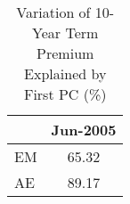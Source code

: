 \begin{footnotesize}\begin{table}\centering\begin{tabular}{l|c}\toprule & Jun-2005 \\\midrule EM & 65.32 \\AE & 89.17 \\\bottomrule\end{tabular}\caption{Variation of 10-Year Term Premium Explained by First PC (\%)}\label{tab:temp_tp_common}\end{table}\end{footnotesize}
